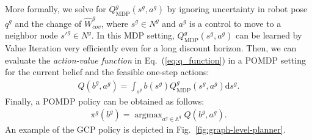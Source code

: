 \documentclass[letterpaper]{article} %
\newcommand{\phdone}[1]{} %
\newcommand{\argmax}{\mathop{\mathrm{argmax}}}
\begin{document}
\phdone{QMDP Details}
More formally, we solve for $Q^g_{\mathrm{MDP}}(s^g, a^g)$ by ignoring uncertainty in robot pose $q^g$ and the change of $\hat{W}^g_{cov}$, where $s^g \in N^g$ and $a^g$ is a control to move to a neighbor node $s'^g \in N^g$.
In this MDP setting, $Q^g_{\mathrm{MDP}}(s^g, a^g)$ can be learned by Value Iteration very efficiently even for a long discount horizon.
%
Then, we can evaluate the \textit{action-value function} in Eq.~(\ref{eq:q_function}) in a POMDP setting for the current belief and the feasible one-step actions:
\begin{align}
  Q(b^g, a^g) = \int_{s^g} b(s^g) Q^g_{\mathrm{MDP}}(s^g, a^g) \mathrm{d}s^g.
\end{align}
%
Finally, a POMDP policy can be obtained as follows:
\begin{align}
  \pi^g(b^g) = \argmax_{a^g \in \mathbb{A}^g} Q(b^g, a^g).
\end{align}
%
An example of the GCP policy is depicted in Fig.~\ref{fig:graph-level-planner}.





\end{document}
